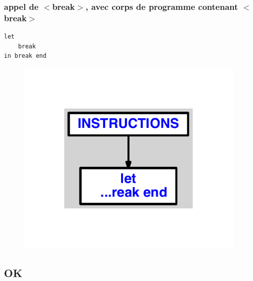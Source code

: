\documentclass{article}
\begin{document}
\subsubsection{appel de $ < $break$ > $, avec corps de programme contenant $ < $break$ > $}
\begin{lstlisting}
let
	break
in break end
\end{lstlisting}
\newpage
\begin{figure}[H]
\centering
\includegraphics[max width=\textwidth]{ast/ast_9.pdf}
\end{figure}
\newpage
\subsection{OK}
\end{document}
